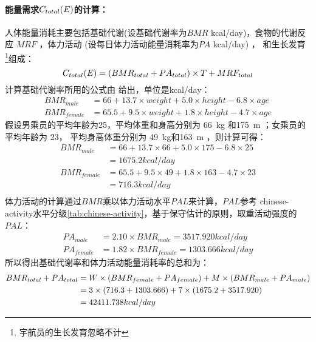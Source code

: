 \documentclass[a4paper]{standalone}
\begin{document}

\def\EnergyConsume{\TotalConsume[E]}
\def\MaleWeight{66}
\def\MaleHeight{175}
\def\MaleAge{25}
\def\FemaleWeight{49}
\def\FemaleHeight{163}
\def\FemaleAge{23}
\def\MaleBMR{1675.2}
\def\FemaleBMR{716.3}
\def\EnergyUnit{kcal/day}
\def\MalePA{3517.920}
\def\FemalePA{1303.666}
\def\TotalBMRplusPA{42411.738}

\paragraph{能量需求$\EnergyConsume$的计算：}
人体能量消耗主要包括基础代谢(设基础代谢率为$BMR$ \EnergyUnit)，食物的代谢反应 $MRF$ ，体力活动 (设每日体力活动能量消耗率为$PA$ \EnergyUnit) ，
和生长发育 \footnote{宇航员的生长发育忽略不计}组成：
\begin{equation}
  \EnergyConsume = (BMR_{total} + PA_{total}) \times T + MRF_{total}
\end{equation}
计算基础代谢率所用的公式由\cite{jeor1990} 给出，单位是\EnergyUnit ：
\begin{align}
  BMR_{male} &= 66 + 13.7 \times weight + 5.0 \times height - 6.8 \times age \\
  BMR_{female} &= 65.5 + 9.5 \times weight + 1.8 \times height - 4.7 \times age
\end{align}
假设男乘员的平均年龄为\MaleAge ，平均体重和身高分别为 \SI{\MaleWeight}{\kilogram} 和\SI{\MaleHeight}{\metre} ；女乘员的平均年龄为
\FemaleAge ， 平均身高体重分别为 \SI{\FemaleWeight}{\kilogram}和\SI{\FemaleHeight}{\metre} ，则计算可得：
\begin{align*}
  BMR_{male} &= 66 + 13.7 \times \MaleWeight + 5.0 \times \MaleHeight - 6.8 \times \MaleAge \\
             &= \MaleBMR \EnergyUnit \\
  BMR_{female} &= 65.5 + 9.5 \times \FemaleWeight + 1.8 \times \FemaleHeight - 4.7 \times \FemaleAge \\
               &= \FemaleBMR \EnergyUnit \\
\end{align*}
体力活动的计算通过$BMR$乘以体力活动水平$PAL$来计算，$PAL$参考
chinese-activity水平分级\cref{tab:chinese-activity}，基于保守估计的原则，取重活动强度的$PAL$：
\begin{align*}
  PA_{male} &= 2.10 \times BMR_{male} = \MalePA \EnergyUnit \\
  PA_{female} &= 1.82 \times BMR_{female} = \FemalePA \EnergyUnit
\end{align*}
所以得出基础代谢率和体力活动能量消耗率的总和为：
\begin{align*}
  BMR_{total} + PA_{total} &= W \times (BMR_{female} + PA_{female}) + M \times (BMR_{male} + PA_{male}) \\
                           &= \FemaleNumber \times (\FemaleBMR + \FemalePA) + \MaleNumer \times (\MaleBMR + \MalePA) \\
                           &= \TotalBMRplusPA \EnergyUnit
\end{align*}
\end{document}
